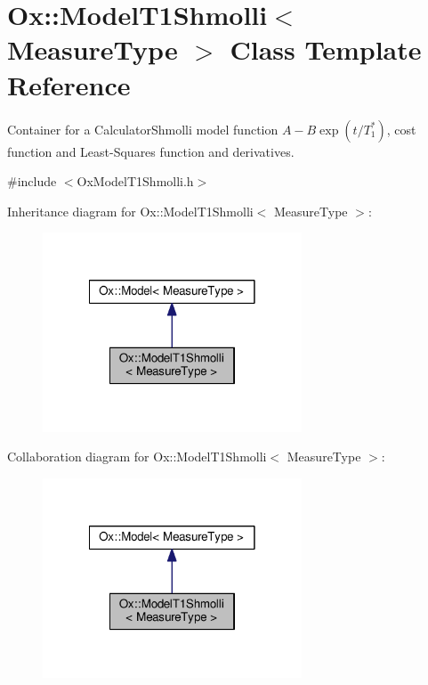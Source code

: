 \hypertarget{class_ox_1_1_model_t1_shmolli}{\section{Ox\-:\-:Model\-T1\-Shmolli$<$ Measure\-Type $>$ Class Template Reference}
\label{class_ox_1_1_model_t1_shmolli}
}


Container for a Calculator\-Shmolli model function $ A-B\exp(t/T_1^*) $, cost function and Least-\/\-Squares function and derivatives.  




{\ttfamily \#include $<$Ox\-Model\-T1\-Shmolli.\-h$>$}



Inheritance diagram for Ox\-:\-:Model\-T1\-Shmolli$<$ Measure\-Type $>$\-:
\nopagebreak
\begin{figure}[H]
\begin{center}
\leavevmode
\includegraphics[width=218pt]{class_ox_1_1_model_t1_shmolli__inherit__graph}
\end{center}
\end{figure}


Collaboration diagram for Ox\-:\-:Model\-T1\-Shmolli$<$ Measure\-Type $>$\-:
\nopagebreak
\begin{figure}[H]
\begin{center}
\leavevmode
\includegraphics[width=218pt]{class_ox_1_1_model_t1_shmolli__coll__graph}
\end{center}
\end{figure}
